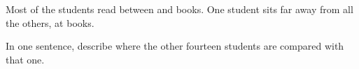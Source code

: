 \documentclass[12pt]{article}
\begin{document}
\begin{enumerate}[leftmargin=1.9em, itemsep=0.42in]
        Most of the students read between \blank{1.3cm} and \blank{1.3cm} books. \quad
        One student sits far away from all the others, at \blank{1.6cm} books.

        \vspace{10pt}
        In one sentence, describe where the other fourteen students are compared with that one.\\[10pt]
        \writeline\\[14pt]\writeline

\end{enumerate}
\end{document}
